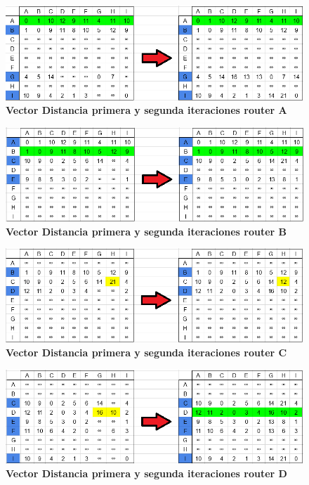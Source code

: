 \documentclass[12pt]{article}
\begin{document}
\begin{figure}[H] 
\centering 
\includegraphics[width=1\textwidth]{imagenes/3A1-2.png} \caption{\small \textbf{Vector Distancia primera y segunda iteraciones router A}}
\label{fig:diagrama_64} 
\end{figure}
\begin{figure}[H] 
\centering 
\includegraphics[width=1\textwidth]{imagenes/3B1-2.png} \caption{\small \textbf{Vector Distancia primera y segunda iteraciones router B}}
\label{fig:diagrama_65} 
\end{figure}
\begin{figure}[H] 
\centering 
\includegraphics[width=1\textwidth]{imagenes/3C1-2.png} \caption{\small \textbf{Vector Distancia primera y segunda iteraciones router C}}
\label{fig:diagrama_66} 
\end{figure}
\begin{figure}[H] 
\centering 
\includegraphics[width=1\textwidth]{imagenes/3D1-2.png} \caption{\small \textbf{Vector Distancia primera y segunda iteraciones router D}}
\label{fig:diagrama_67} 
\end{figure}
\end{document}
